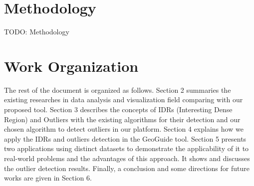 \section{Methodology}

TODO: Methodology

\section{Work Organization}

The rest of the document is organized as follows. Section 2 summaries the existing researches
in data analysis and visualization field comparing with our proposed tool. Section 3 describes
the concepts of IDRs (Interesting Dense Region) and Outliers with the existing algorithms for
their detection and our chosen algorithm to detect outliers in our platform. Section 4 explains
how we apply the IDRs and outliers detection in the GeoGuide tool. Section 5 presents two
applications using distinct datasets to demonstrate the applicability of it to real-world
problems and the advantages of this approach. It shows and discusses the outlier detection
results. Finally, a conclusion and some directions for future works are given in Section 6.
